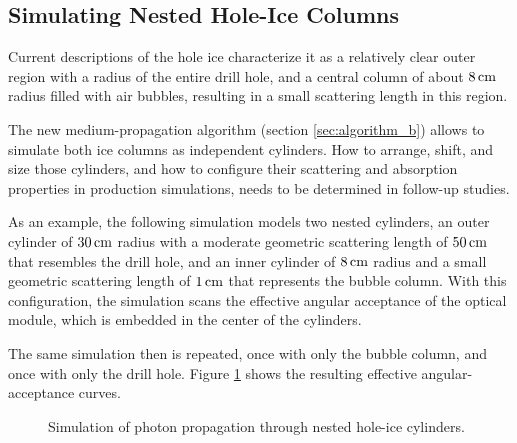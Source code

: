 \subsection{Simulating Nested Hole-Ice Columns}
\label{sec:nested_cylinders}

Current descriptions of the hole ice characterize it as a relatively
clear outer region with a radius of the entire drill hole, and a central
column of about \(8\text{\,cm}\) radius filled with air bubbles, resulting in a
small scattering length in this region.
\cite{instrumentation,icrc17pocam,rongenswedishcamera,martinspicehddard}

The new medium-propagation algorithm (section \ref{sec:algorithm_b})
allows to simulate both ice columns as independent cylinders. How to
arrange, shift, and size those cylinders, and how to configure their
scattering and absorption properties in production simulations, needs to
be determined in follow-up studies.\followup

As an example, the following simulation models two nested cylinders, an
outer cylinder of \(30\text{\,cm}\) radius with a moderate geometric scattering
length of \(50\text{\,cm}\) that resembles the drill hole, and an inner cylinder
of \(8\text{\,cm}\) radius and a small geometric scattering length of \(1\text{\,cm}\)
that represents the bubble column. With this configuration, the
simulation scans the effective angular acceptance of the optical module,
which is embedded in the center of the cylinders.


The same simulation then is repeated, once with only the bubble column,
and once with only the drill hole. Figure \ref{fig:haiv2IGi} shows the
resulting effective angular-acceptance curves.

\begin{figure}[htbp]
  \hfill
  \caption{Simulation of photon propagation through nested hole-ice cylinders.}
  \label{fig:haiv2IGi}
\end{figure}


